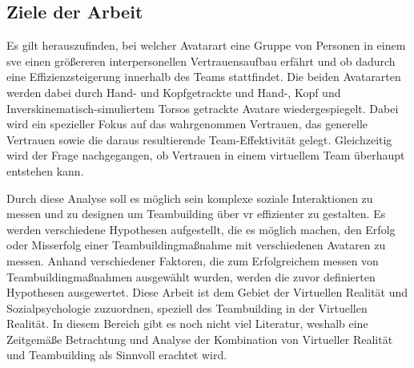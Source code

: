 \documentclass[a4paper,11pt]{article}%
\renewcommand{\\}{\vspace*{0.5\baselineskip} \newline}
\begin{document}
		\subsection{Ziele der Arbeit}
		Es gilt herauszufinden, bei welcher Avatarart eine Gruppe von Personen in einem \ac{sve} einen größereren interpersonellen Vertrauensaufbau erfährt und ob dadurch eine Effizienzsteigerung innerhalb des Teams stattfindet. Die beiden Avatararten werden dabei durch Hand- und Kopfgetrackte und Hand-, Kopf und Inverskinematisch-simuliertem Torsos getrackte Avatare wiedergespiegelt. Dabei wird ein spezieller Fokus auf das wahrgenommen Vertrauen, das generelle Vertrauen sowie die daraus resultierende Team-Effektivität gelegt.
Gleichzeitig wird der Frage nachgegangen, ob Vertrauen in einem virtuellem Team überhaupt entstehen kann.

	Durch diese Analyse soll es möglich sein komplexe soziale Interaktionen zu messen und zu designen um Teambuilding über \ac{vr} effizienter zu gestalten.\\
	Es werden verschiedene Hypothesen aufgestellt, die es möglich machen, den Erfolg oder Misserfolg einer Teambuildingmaßnahme mit verschiedenen Avataren zu messen.\\
	Anhand verschiedener Faktoren, die zum Erfolgreichem messen von Teambuildingmaßnahmen ausgewählt wurden, werden die zuvor definierten Hypothesen ausgewertet.\\
	Diese Arbeit ist dem Gebiet der Virtuellen Realität und Sozialpsychologie zuzuordnen, speziell des Teambuilding in der Virtuellen Realität.
	In diesem Bereich gibt es noch nicht viel Literatur, weshalb eine Zeitgemäße Betrachtung und Analyse der Kombination von Virtueller Realität und Teambuilding als Sinnvoll erachtet wird.\\

\end{document}
